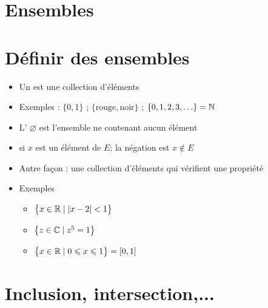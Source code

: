 \section{Ensembles}

\section{Définir des ensembles}

\begin{frame}

\begin{itemize}
  \item Un  est une collection d'éléments

\pause

  \item Exemples : $\{ 0, 1 \}$ \; ; \; $\{ \text{rouge}, \text{noir} \}$ 
  \; ; \; $\{0, 1, 2, 3,\ldots\} = \mathbb{N}$

\pause

  \item L' $\varnothing$ est l'ensemble ne contenant aucun élément

\pause

  \item {} si $x$ est un élément de $E$; \; la négation est $x \notin E$

\pause

  \item Autre façon : une collection d'éléments qui vérifient une propriété

 \pause
  
  \item Exemples
  \begin{itemize}
     \item $\big\{ x \in \mathbb{R} \mid  |x-2| < 1 \big\}$
     \item $\big\{ z \in \mathbb{C} \mid z^5=1 \big\}$
     \item $\big\{ x \in \mathbb{R} \mid 0 \leqslant x \leqslant 1 \big\}=[0,1]$
  \end{itemize}
   
\end{itemize}
\end{frame}

\section{Inclusion, intersection,...}

